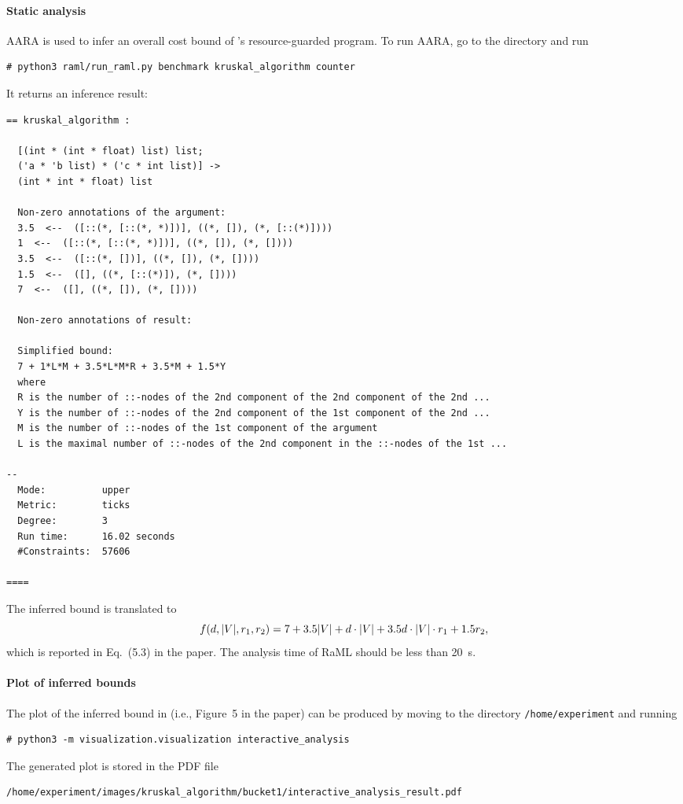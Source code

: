 \paragraph{Static analysis}

AARA is used to infer an overall cost bound of \kruskal{}'s resource-guarded
program.
%
To run AARA, go to the directory  and run
\begin{verbatim}
# python3 raml/run_raml.py benchmark kruskal_algorithm counter
\end{verbatim}
%
It returns an inference result:
\begin{Verbatim}[fontsize=\footnotesize]
== kruskal_algorithm :

  [(int * (int * float) list) list;
  ('a * 'b list) * ('c * int list)] ->
  (int * int * float) list

  Non-zero annotations of the argument:
  3.5  <--  ([::(*, [::(*, *)])], ((*, []), (*, [::(*)])))
  1  <--  ([::(*, [::(*, *)])], ((*, []), (*, [])))
  3.5  <--  ([::(*, [])], ((*, []), (*, [])))
  1.5  <--  ([], ((*, [::(*)]), (*, [])))
  7  <--  ([], ((*, []), (*, [])))

  Non-zero annotations of result:

  Simplified bound:
  7 + 1*L*M + 3.5*L*M*R + 3.5*M + 1.5*Y
  where
  R is the number of ::-nodes of the 2nd component of the 2nd component of the 2nd ...
  Y is the number of ::-nodes of the 2nd component of the 1st component of the 2nd ...
  M is the number of ::-nodes of the 1st component of the argument
  L is the maximal number of ::-nodes of the 2nd component in the ::-nodes of the 1st ...

--
  Mode:          upper
  Metric:        ticks
  Degree:        3
  Run time:      16.02 seconds
  #Constraints:  57606

====
\end{Verbatim}
%
The inferred bound is translated to
\begin{equation}
  f (d, |{V}|, r_1, r_2) = 7 + 3.5 |{V}| + d \cdot |{V}| + 3.5 d \cdot |{V}| \cdot r_1 + 1.5 r_2,
\end{equation}
which is reported in Eq.~(5.3) in the paper.
%
The analysis time of RaML should be less than \qty{20}{\second}.

\paragraph{Plot of inferred bounds}

The plot of the inferred bound in \kruskal{} (i.e., Figure~5 in the paper) can
be produced by moving to the directory \texttt{/home/experiment} and running
\begin{verbatim}
# python3 -m visualization.visualization interactive_analysis
\end{verbatim}
%
The generated plot is stored in the PDF file
\begin{verbatim}
/home/experiment/images/kruskal_algorithm/bucket1/interactive_analysis_result.pdf
\end{verbatim}


